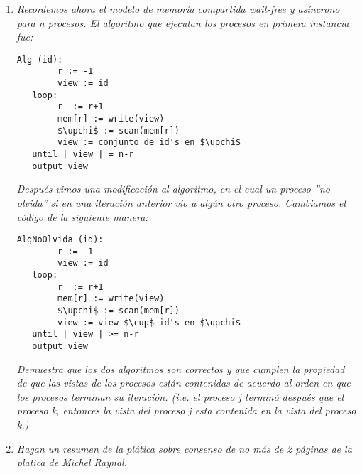 \documentclass{article}
\begin{document}
\begin{enumerate}
  \item{
      \textsl{
        Recordemos ahora el modelo de memoría compartida wait-free y
        asíncrono para n procesos. El algoritmo que ejecutan los
        procesos en primera instancia fue:
      }
      \begin{lstlisting}[frame=single,mathescape]
Alg (id):
        r := -1
        view := id
   loop:
        r  := r+1
        mem[r] := write(view)
        $\upchi$ := scan(mem[r])
        view := conjunto de id's en $\upchi$
   until | view | = n-r
   output view
      \end{lstlisting}
      \textsl{
        Después vimos una modificación al algoritmo, en el cual un
        proceso ''no olvida'' si en una iteración anterior vio a algún
        otro proceso. Cambiamos el código de la siguiente manera:
      }
\begin{lstlisting}[frame=single,mathescape]
AlgNoOlvida (id):
        r := -1
        view := id
   loop:
        r  := r+1
        mem[r] := write(view)
        $\upchi$ := scan(mem[r])
        view := view $\cup$ id's en $\upchi$
   until | view | >= n-r
   output view
      \end{lstlisting}
      \textsl{
        Demuestra que los dos algoritmos son correctos y que cumplen
        la propiedad de que las vistas de los procesos están
        contenidas de acuerdo al orden en que los procesos terminan su
        iteración. (i.e. el proceso j terminó después que el proceso
        k, entonces la vista del proceso j esta contenida en la vista
        del proceso k.)
      }
    }

  \item{
      \textsl{
        Hagan un resumen de la plática sobre consenso de no más de 2
        páginas de la platica de Michel Raynal.
      }
    }
    
\end{enumerate}
\end{document}
